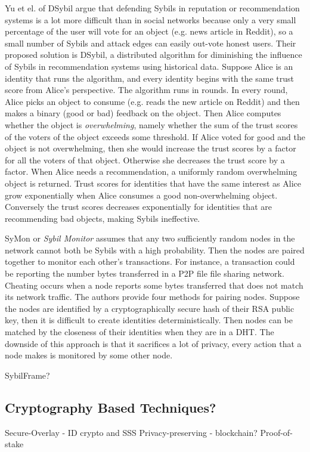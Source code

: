 Yu et el. of DSybil\cite{yu2009dsybil} argue that defending Sybils in reputation
or recommendation systems is a lot more difficult than in social networks
because only a very small percentage of the user will vote for an object (e.g.
news article in Reddit), so a small number of Sybils and attack edges can easily
out-vote honest users. Their proposed solution is DSybil, a distributed
algorithm for diminishing the influence of Sybils in recommendation systems
using historical data. Suppose Alice is an identity that runs the algorithm, and
every identity begins with the same trust score from Alice's perspective. The
algorithm runs in rounds. In every round, Alice picks an object to consume (e.g.
reads the new article on Reddit) and then makes a binary (good or bad) feedback
on the object. Then Alice computes whether the object is \emph{overwhelming},
namely whether the sum of the trust scores of the voters of the object exceeds
some threshold. If Alice voted for good and the object is not overwhelming, then
she would increase the trust scores by a factor for all the voters of that
object. Otherwise she decreases the trust score by a factor. When Alice needs a
recommendation, a uniformly random overwhelming object is returned. Trust scores
for identities that have the same interest as Alice grow exponentially when
Alice consumes a good non-overwhelming object. Conversely the trust scores
decreases exponentially for identities that are recommending bad objects, making
Sybils ineffective.

SyMon\cite{jyothi2009symon} or \emph{Sybil Monitor} assumes that any two
sufficiently random nodes in the network cannot both be Sybils with a high
probability. Then the nodes are paired together to monitor each other's
transactions. For instance, a transaction could be reporting the number bytes
transferred in a P2P file file sharing network. Cheating occurs when a node
reports some bytes transferred that does not match its network traffic. The
authors provide four methods for pairing nodes. Suppose the nodes are identified
by a cryptographically secure hash of their RSA public key, then it is difficult
to create identities deterministically. Then nodes can be matched by the
closeness of their identities when they are in a DHT. The downside of this
approach is that it sacrifices a lot of privacy, every action that a node makes
is monitored by some other node.

SybilFrame?

\subsection{Cryptography Based Techniques?}
Secure-Overlay\cite{lua2007securing} - ID crypto and SSS
Privacy-preserving\cite{schaub2016trustless} - blockchain?
Proof-of-stake\cite{dennis2016rep}

